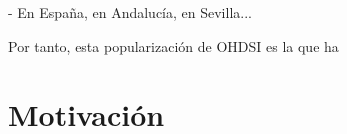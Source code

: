     - En España, en Andalucía, en Sevilla...


Por tanto, esta popularización de OHDSI es la que ha 
    

    









    


    


\section{Motivación}








    






